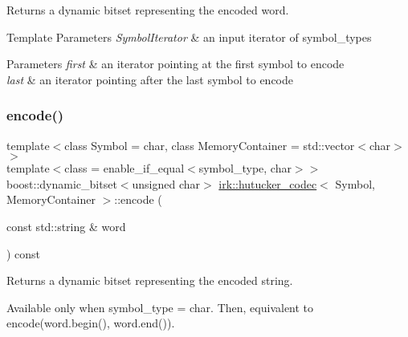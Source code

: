 Returns a dynamic bitset representing the encoded word. 


\begin{DoxyTemplParams}{Template Parameters}
{\em Symbol\+Iterator} & an input iterator of {\ttfamily symbol\+\_\+type}s \\
\hline
\end{DoxyTemplParams}

\begin{DoxyParams}{Parameters}
{\em first} & an iterator pointing at the first symbol to encode \\
\hline
{\em last} & an iterator pointing after the last symbol to encode \\
\hline
\end{DoxyParams}
\mbox{\label{classirk_1_1hutucker__codec_a9f69f70ca8a04d326b6828e523500777}} 
\subsubsection{\texorpdfstring{encode()}{encode()}\hspace{0.1cm}{\footnotesize\ttfamily [2/5]}}
{\footnotesize\ttfamily template$<$class Symbol = char, class Memory\+Container = std\+::vector$<$char$>$$>$ \\
template$<$class  = enable\+\_\+if\+\_\+equal$<$symbol\+\_\+type, char$>$$>$ \\
boost\+::dynamic\+\_\+bitset$<$unsigned char$>$ \mbox{\hyperlink{classirk_1_1hutucker__codec}{irk\+::hutucker\+\_\+codec}}$<$ Symbol, Memory\+Container $>$\+::encode (\begin{DoxyParamCaption}\item[{const std\+::string \&}]{word }\end{DoxyParamCaption}) const\hspace{0.3cm}{\ttfamily [inline]}}



Returns a dynamic bitset representing the encoded string. 

Available only when {\ttfamily symbol\+\_\+type = char}. Then, equivalent to {\ttfamily encode(word.\+begin(), word.\+end())}. \mbox{\label{classirk_1_1hutucker__codec_a3f0df69a4d865e5f1e89e90b4f250dae}} 
